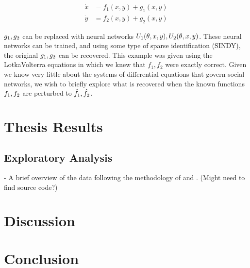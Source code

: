 \documentclass{article}
\begin{document}
        \begin{align}
            \dot x &= f_1(x,y)+g_1(x,y) \\
            \dot y &= f_2(x,y)+g_2(x,y)
        \end{align}
        
        ${g_1, \space g_2}$ can be replaced with neural networks $U_1(\theta, x, y), \space U_2(\theta, x, y)$. These neural networks can be trained, and using some type of sparse identification (SINDY), the original $g_1, \space g_2$ can be recovered. This example was given using the Lotka\-Volterra equations in which we knew that $f_1, f_2$ were exactly correct. Given we know very little about the systems of differential equations that govern social networks, we wish to briefly explore what is recovered when the known functions $f_1, \space f_2$ are perturbed to $\hat f_1, \space \hat f_2$. 
\section{Thesis Results}
\subsection{Exploratory Analysis}
- A brief overview of the data following the methodology of \cite{zhao2012multi} and \cite{garg2009evolution}. (Might need to find source code?)
\section{Discussion}

\section{Conclusion}

\printbibliography
\end{document}
